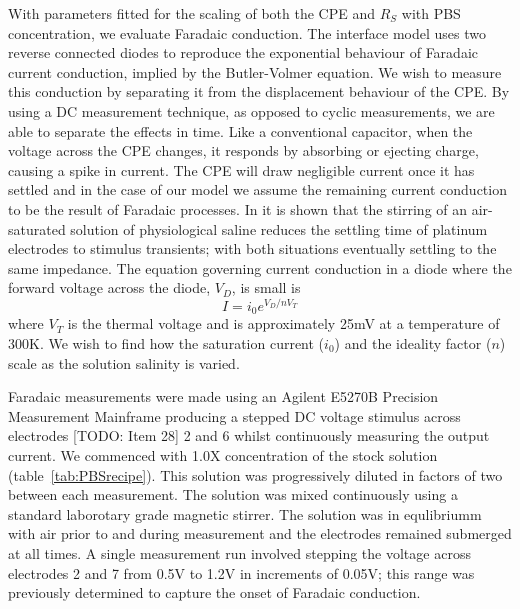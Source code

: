 \documentclass[journal, a4paper]{IEEEtran}
\begin{document}
{With parameters fitted for the scaling of both the CPE and $R_{S}$ with PBS concentration, we evaluate Faradaic conduction. The interface model uses two reverse connected diodes to reproduce the exponential behaviour of Faradaic current conduction, implied by the Butler-Volmer equation. We wish to measure this conduction by separating it from the displacement behaviour of the CPE. By using a DC measurement technique, as opposed to cyclic measurements, we are able to separate the effects in time. 
Like a conventional capacitor, when the voltage across the CPE changes, it responds by absorbing or ejecting charge, causing a spike in current. The CPE will draw negligible current once it has settled and in the case of our model we assume the remaining current conduction to be the result of Faradaic processes. 
{\color{blue} In \cite{Greatbatch1969} it is shown that the stirring of an air-saturated solution of physiological saline reduces the settling time of platinum electrodes to stimulus transients; with both situations eventually settling to the same impedance.}
The equation governing current conduction in a diode where the forward voltage across the diode, $V_{D}$, is small is
\begin{equation}
    I = i_{0}  e^{V_{D} / n V_{T}}
\end{equation}
where $V_{T}$ is the thermal voltage and is approximately 25\thinspace mV at a temperature of 300\thinspace K. We wish to find how the saturation current ($i_{0}$) and the ideality factor ($n$) scale as the solution salinity is varied.

Faradaic measurements were made using an Agilent E5270B Precision Measurement Mainframe producing a stepped DC voltage stimulus across electrodes [TODO: Item 28] 2 and 6 whilst continuously measuring the output current. We commenced with 1.0X concentration of the stock solution (table~\ref{tab:PBSrecipe}). This solution was progressively diluted in factors of two between each measurement. The solution was mixed continuously using a standard laborotary grade magnetic stirrer. The solution was in equlibriumm with air prior to and during measurement and the electrodes remained submerged at all times.
A single measurement run involved stepping the voltage across electrodes 2 and 7 from 0.5\thinspace V to 1.2\thinspace V in increments of 0.05\thinspace V; this range was previously determined to capture the onset of Faradaic conduction.

}
\end{document}
